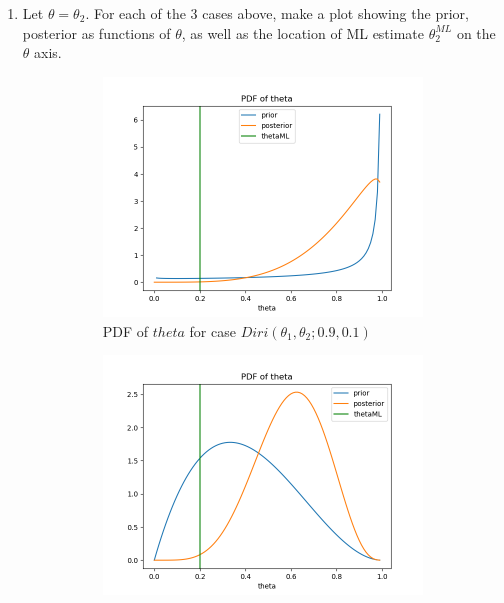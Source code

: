 \documentclass[preprint,12pt]{elsarticle}
\begin{document}
\begin{enumerate}[label=\alph*]
		\item Let $\theta=\theta_2$. For each of the 3 cases above, make a plot 
		showing the prior, posterior as functions of $\theta$, as well as
		the location of ML estimate $\theta_2^{ML}$ on the $\theta$ axis.
		\begin{figure}[h!]
            \center
            \begin{subfigure}{0.48\textwidth}
                \includegraphics[width = \textwidth]{1.png}
                \caption{PDF of $theta$ for case $Diri(\theta_1,\theta_2;0.9,0.1)$}
                \label{fig:11}
            \end{subfigure}
            \begin{subfigure}{0.48\textwidth}
                \includegraphics[width = \textwidth]{2.png}

\end{subfigure}
\end{figure}
\end{enumerate}
\end{document}
